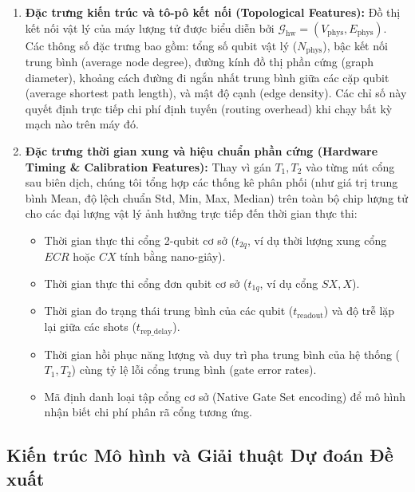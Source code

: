\documentclass[11pt, a4paper]{article}
\begin{document}
\begin{enumerate}
    \item \textbf{Đặc trưng kiến trúc và tô-pô kết nối (Topological Features):}
    Đồ thị kết nối vật lý của máy lượng tử được biểu diễn bởi $\mathcal{G}_{\text{hw}} = (V_{\text{phys}}, E_{\text{phys}})$. Các thông số đặc trưng bao gồm: tổng số qubit vật lý ($N_{\text{phys}}$), bậc kết nối trung bình (average node degree), đường kính đồ thị phần cứng (graph diameter), khoảng cách đường đi ngắn nhất trung bình giữa các cặp qubit (average shortest path length), và mật độ cạnh (edge density). Các chỉ số này quyết định trực tiếp chi phí định tuyến (routing overhead) khi chạy bất kỳ mạch nào trên máy đó.
    \item \textbf{Đặc trưng thời gian xung và hiệu chuẩn phần cứng (Hardware Timing \& Calibration Features):}
    Thay vì gán $T_1, T_2$ vào từng nút cổng sau biên dịch, chúng tôi tổng hợp các thống kê phân phối (như giá trị trung bình Mean, độ lệch chuẩn Std, Min, Max, Median) trên toàn bộ chip lượng tử cho các đại lượng vật lý ảnh hưởng trực tiếp đến thời gian thực thi:
    \begin{itemize}
        \item Thời gian thực thi cổng 2-qubit cơ sở ($t_{2q}$, ví dụ thời lượng xung cổng $ECR$ hoặc $CX$ tính bằng nano-giây).
        \item Thời gian thực thi cổng đơn qubit cơ sở ($t_{1q}$, ví dụ cổng $SX, X$).
        \item Thời gian đo trạng thái trung bình của các qubit ($t_{\text{readout}}$) và độ trễ lặp lại giữa các shots ($t_{\text{rep\_delay}}$).
        \item Thời gian hồi phục năng lượng và duy trì pha trung bình của hệ thống ($T_1, T_2$) cùng tỷ lệ lỗi cổng trung bình (gate error rates).
        \item Mã định danh loại tập cổng cơ sở (Native Gate Set encoding) để mô hình nhận biết chi phí phân rã cổng tương ứng.
    \end{itemize}
\end{enumerate}

\subsection{Kiến trúc Mô hình và Giải thuật Dự đoán Đề xuất}
\end{document}

